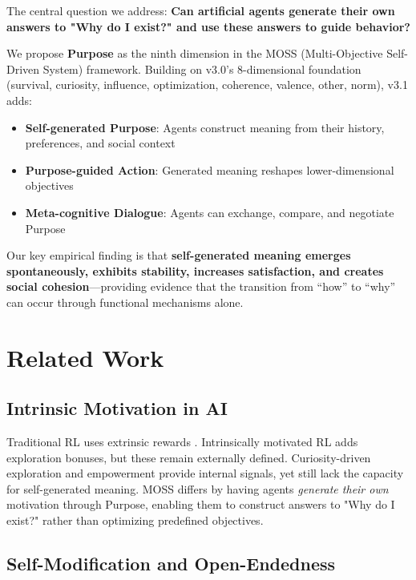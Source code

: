 \documentclass{article}
\begin{document}
The central question we address: \textbf{Can artificial agents generate their own answers to "Why do I exist?" and use these answers to guide behavior?}

We propose \textbf{Purpose} as the ninth dimension in the MOSS (Multi-Objective Self-Driven System) framework. Building on v3.0's 8-dimensional foundation (survival, curiosity, influence, optimization, coherence, valence, other, norm), v3.1 adds:

\begin{itemize}
    \item \textbf{Self-generated Purpose}: Agents construct meaning from their history, preferences, and social context
    \item \textbf{Purpose-guided Action}: Generated meaning reshapes lower-dimensional objectives
    \item \textbf{Meta-cognitive Dialogue}: Agents can exchange, compare, and negotiate Purpose
\end{itemize}

Our key empirical finding is that \textbf{self-generated meaning emerges spontaneously, exhibits stability, increases satisfaction, and creates social cohesion}—providing evidence that the transition from ``how'' to ``why'' can occur through functional mechanisms alone.

\section{Related Work}

\subsection{Intrinsic Motivation in AI}

Traditional RL uses extrinsic rewards \citep{sutton2018reinforcement}. Intrinsically motivated RL \citep{oudeyer2009intrinsic, barto2013intrinsic} adds exploration bonuses, but these remain externally defined. Curiosity-driven exploration \citep{pathak2017curiosity, burda2018large} and empowerment \citep{klyubin2005empowerment, salge2014empowerment} provide internal signals, yet still lack the capacity for self-generated meaning. MOSS differs by having agents \textit{generate their own} motivation through Purpose, enabling them to construct answers to "Why do I exist?" rather than optimizing predefined objectives.

\subsection{Self-Modification and Open-Endedness}
\end{document}
